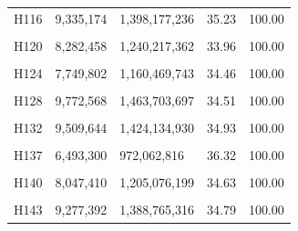 \documentclass[
  a4paper,
  titlepage]{article}
\begin{document}
\begin{longtable}[t]{lllll}
H116 & 9,335,174 & 1,398,177,236 & 35.23 & 100.00\\
 
\cellcolor{gray!6}{H117} & \cellcolor{gray!6}{10,474,574} & \cellcolor{gray!6}{1,568,944,541} & \cellcolor{gray!6}{34.78} & \cellcolor{gray!6}{100.00}\\
 
H120 & 8,282,458 & 1,240,217,362 & 33.96 & 100.00\\
 
\cellcolor{gray!6}{H121} & \cellcolor{gray!6}{8,978,486} & \cellcolor{gray!6}{1,344,812,205} & \cellcolor{gray!6}{34.74} & \cellcolor{gray!6}{100.00}\\
 
H124 & 7,749,802 & 1,160,469,743 & 34.46 & 100.00\\
 
\cellcolor{gray!6}{H127} & \cellcolor{gray!6}{8,139,828} & \cellcolor{gray!6}{1,219,020,585} & \cellcolor{gray!6}{34.80} & \cellcolor{gray!6}{100.00}\\
 
H128 & 9,772,568 & 1,463,703,697 & 34.51 & 100.00\\
 
\cellcolor{gray!6}{H129} & \cellcolor{gray!6}{6,886,274} & \cellcolor{gray!6}{1,031,065,447} & \cellcolor{gray!6}{34.67} & \cellcolor{gray!6}{100.00}\\
 
H132 & 9,509,644 & 1,424,134,930 & 34.93 & 100.00\\
 
\cellcolor{gray!6}{H135} & \cellcolor{gray!6}{8,083,578} & \cellcolor{gray!6}{1,210,412,745} & \cellcolor{gray!6}{34.52} & \cellcolor{gray!6}{100.00}\\
 
H137 & 6,493,300 & 972,062,816 & 36.32 & 100.00\\
 
\cellcolor{gray!6}{H138} & \cellcolor{gray!6}{9,240,716} & \cellcolor{gray!6}{1,383,657,705} & \cellcolor{gray!6}{34.70} & \cellcolor{gray!6}{100.00}\\
 
H140 & 8,047,410 & 1,205,076,199 & 34.63 & 100.00\\
 
\cellcolor{gray!6}{H142} & \cellcolor{gray!6}{6,249,442} & \cellcolor{gray!6}{935,855,185} & \cellcolor{gray!6}{34.90} & \cellcolor{gray!6}{100.00}\\
 
H143 & 9,277,392 & 1,388,765,316 & 34.79 & 100.00\\
 

\end{longtable}
\end{document}
